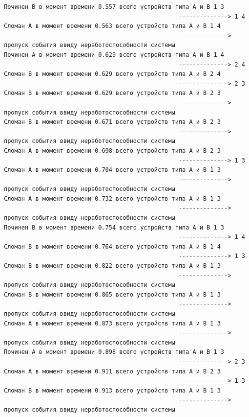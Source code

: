 \begin{verbatim}
Починен B в момент времени 0.557 всего устройств типа А и В 1 3
                                                  --------------> 1 4
Сломан A в момент времени 0.563 всего устройств типа А и В 1 4
                                                  --------------> пропуск события ввиду неработоспособности системы
Починен A в момент времени 0.629 всего устройств типа А и В 1 4
                                                  --------------> 2 4
Сломан B в момент времени 0.629 всего устройств типа А и В 2 4
                                                  --------------> 2 3
Сломан B в момент времени 0.629 всего устройств типа А и В 2 3
                                                  --------------> пропуск события ввиду неработоспособности системы
Сломан B в момент времени 0.671 всего устройств типа А и В 2 3
                                                  --------------> пропуск события ввиду неработоспособности системы
Сломан A в момент времени 0.698 всего устройств типа А и В 2 3
                                                  --------------> 1 3
Сломан A в момент времени 0.704 всего устройств типа А и В 1 3
                                                  --------------> пропуск события ввиду неработоспособности системы
Сломан A в момент времени 0.732 всего устройств типа А и В 1 3
                                                  --------------> пропуск события ввиду неработоспособности системы
Починен B в момент времени 0.754 всего устройств типа А и В 1 3
                                                  --------------> 1 4
Сломан B в момент времени 0.764 всего устройств типа А и В 1 4
                                                  --------------> 1 3
Сломан B в момент времени 0.822 всего устройств типа А и В 1 3
                                                  --------------> пропуск события ввиду неработоспособности системы
Сломан B в момент времени 0.865 всего устройств типа А и В 1 3
                                                  --------------> пропуск события ввиду неработоспособности системы
Сломан A в момент времени 0.873 всего устройств типа А и В 1 3
                                                  --------------> пропуск события ввиду неработоспособности системы
Починен A в момент времени 0.898 всего устройств типа А и В 1 3
                                                  --------------> 2 3
Сломан A в момент времени 0.911 всего устройств типа А и В 2 3
                                                  --------------> 1 3
Сломан B в момент времени 0.913 всего устройств типа А и В 1 3
                                                  --------------> пропуск события ввиду неработоспособности системы

\end{verbatim}
